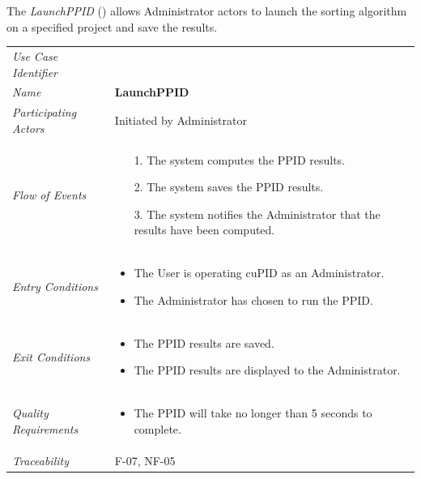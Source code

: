 \documentclass[12pt,letterpaper]{article}
\begin{document}
\vspace{1em}
The {\it LaunchPPID} ({\bf \launchppid{}}) allows Administrator actors to launch the sorting algorithm on a specified project and save the results.

\begin{center}
	\begin{tabu} to 
		\toprule
		Use Case Identifier & \launchppid{} \\
		Name & {\bf LaunchPPID} \\
		Participating Actors & Initiated by Administrator \\
		Flow of Events & 
		\begin{minipage}[t]{\linewidth}
		    \begin{enumerate}
			    \item[1.] The system computes the PPID results.
			    \item[2.] The system saves the PPID results.
			    \item[3.] The system notifies the Administrator that the results have been computed.
			\end{enumerate}
	    \end{minipage} \\

		Entry Conditions &
		\begin{minipage}[t]{\linewidth}
			\begin{itemize}
			    \item The User is operating cuPID as an Administrator.
			    \item The Administrator has chosen to run the PPID.
	        \end{itemize}
	    \end{minipage} \\

		Exit Conditions &
		\begin{minipage}[t]{\linewidth}
			\begin{itemize}
			    \item The PPID results are saved.
			    \item The PPID results are displayed to the Administrator.
	        \end{itemize}
	    \end{minipage} \\

		Quality Requirements &
		\begin{minipage}[t]{\linewidth}
			\begin{itemize}
			    \item The PPID will take no longer than 5 seconds to complete.
	        \end{itemize}
	    \end{minipage} \\

		Traceability & F-07, NF-05 \\
		\toprule
	\end{tabu}
\end{center}
\end{document}
